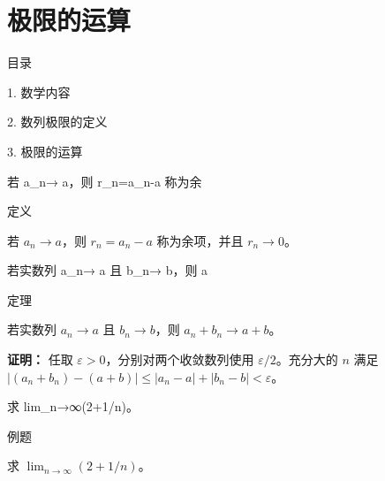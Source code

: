 \documentclass[aspectratio=169,10pt,fontset=fandol]{ctexbeamer}
\makeatletter
\newcommand{\mathagentsectionlabelcontext}{%
\protected@edef\@currentlabel{\thesection}%
\edef\@currentHref{Outline\the\c@part.\the\c@section}%
}
\makeatother
\begin{document}
\section{极限的运算}
\begin{frame}[t,fragile]{目录}
\normalsize
{\color{black}\normalsize 1. 数学内容\par}\vspace{0.22em}
{\color{black}\normalsize 2. 数列极限的定义\par}\vspace{0.22em}
{\color{blue}\normalsize 3. 极限的运算\par}\vspace{0.22em}
\end{frame}
\begin{frame}[t,fragile]{若 a\_n→ a，则 r\_n=a\_n-a 称为余}
\normalsize
{\normalsize
\mathagentsectionlabelcontext
\label{sec:S02}

}
\begin{block}{定义}
{\normalsize
若 $a_n\to a$，则 $r_n=a_n-a$ 称为余项，并且 $r_n\to0$。

}
\end{block}
\end{frame}
\begin{frame}[t,fragile]{若实数列 a\_n→ a 且 b\_n→ b，则 a}
\normalsize
\begin{block}{定理}
{\normalsize
若实数列 $a_n\to a$ 且 $b_n\to b$，则 $a_n+b_n\to a+b$。

}
\end{block}
\pause
{\normalsize
\textbf{证明：}
任取 $\varepsilon>0$，分别对两个收敛数列使用 $\varepsilon/2$。充分大的 $n$ 满足 $|(a_n+b_n)-(a+b)|\leq |a_n-a|+|b_n-b|<\varepsilon$。

}
\end{frame}
\begin{frame}[t,fragile]{求 lim\_n→∞(2+1/n)。}
\normalsize
\begin{block}{例题}
{\normalsize
求 $\lim_{n\to\infty}(2+1/n)$。

}
\end{block}
\end{frame}
\end{document}

